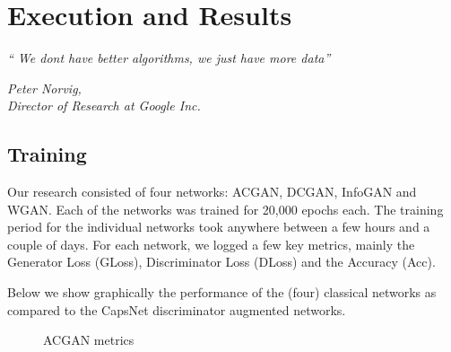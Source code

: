 \chapter{Execution and Results}\label{ch:execandresults}
\epigraph{\textit{ \normalsize“ We dont have better algorithms, we just have more data”}}{\normalsize\textit{Peter Norvig,\\ Director of Research at Google Inc.}}

\section{Training} %
\label{sec:training}

Our research consisted of four networks: ACGAN, DCGAN, InfoGAN and WGAN. Each of the networks was trained for 20,000 epochs each. The training period for the individual networks took anywhere between a few hours and a couple of days. For each network, we logged a few key metrics, mainly the Generator Loss (GLoss), Discriminator Loss (DLoss) and the Accuracy (Acc). 
\par\bigskip
Below we show graphically the performance of the (four) classical networks as compared to the CapsNet discriminator augmented networks.

\begin{figure}[H]
    \centering
    \qquad
    \caption{ACGAN metrics}%
    \label{fig:acgan}%
\end{figure}

